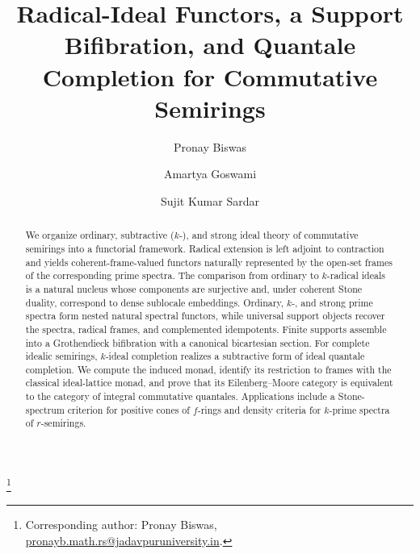 \documentclass[12pt,leqno]{amsart}
\theoremstyle{definition}
\numberwithin{equation}{section}
\theoremstyle{remark}
\begin{document}
\raggedbottom

\title[Radical-ideal functors and quantale completion]{Radical-Ideal Functors, a Support Bifibration, and Quantale Completion for Commutative Semirings}

\author{Pronay Biswas}
\thanks{Corresponding author: Pronay Biswas, \href{mailto:pronayb.math.rs@jadavpuruniversity.in}{pronayb.math.rs@jadavpuruniversity.in}.}
\address{Department of Mathematics, Jadavpur University, 188 Raja Subodh Chandra Mallick Road, Jadavpur, Kolkata, West Bengal 700032, India}

\author{Amartya Goswami}
\address{Department of Mathematics and Applied Mathematics, University of Johannesburg, P.O. Box 524, Auckland Park 2006, South Africa; and National Institute for Theoretical and Computational Sciences (NITheCS), South Africa}

\author{Sujit Kumar Sardar}
\address{Department of Mathematics, Jadavpur University, 188 Raja Subodh Chandra Mallick Road, Jadavpur, Kolkata, West Bengal 700032, India}


\begin{abstract}
We organize ordinary, subtractive ($k$-), and strong ideal theory of commutative semirings into a functorial framework. Radical extension is left adjoint to contraction and yields coherent-frame-valued functors naturally represented by the open-set frames of the corresponding prime spectra. The comparison from ordinary to $k$-radical ideals is a natural nucleus whose components are surjective and, under coherent Stone duality, correspond to dense sublocale embeddings. Ordinary, $k$-, and strong prime spectra form nested natural spectral functors, while universal support objects recover the spectra, radical frames, and complemented idempotents. Finite supports assemble into a Grothendieck bifibration with a canonical bicartesian section. For complete idealic semirings, $k$-ideal completion realizes a subtractive form of ideal quantale completion. We compute the induced monad, identify its restriction to frames with the classical ideal-lattice monad, and prove that its Eilenberg--Moore category is equivalent to the category of integral commutative quantales. Applications include a Stone-spectrum criterion for positive cones of $f$-rings and density criteria for $k$-prime spectra of $r$-semirings.
\end{abstract}
\end{document}
